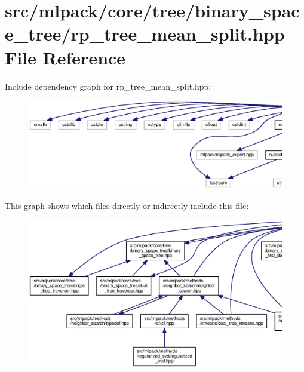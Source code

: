 \section{src/mlpack/core/tree/binary\+\_\+space\+\_\+tree/rp\+\_\+tree\+\_\+mean\+\_\+split.hpp File Reference}
\label{rp__tree__mean__split_8hpp}
Include dependency graph for rp\+\_\+tree\+\_\+mean\+\_\+split.\+hpp\+:
\nopagebreak
\begin{figure}[H]
\begin{center}
\leavevmode
\includegraphics[width=350pt]{rp__tree__mean__split_8hpp__incl}
\end{center}
\end{figure}
This graph shows which files directly or indirectly include this file\+:
\nopagebreak
\begin{figure}[H]
\begin{center}
\leavevmode
\includegraphics[width=350pt]{rp__tree__mean__split_8hpp__dep__incl}
\end{center}
\end{figure}
